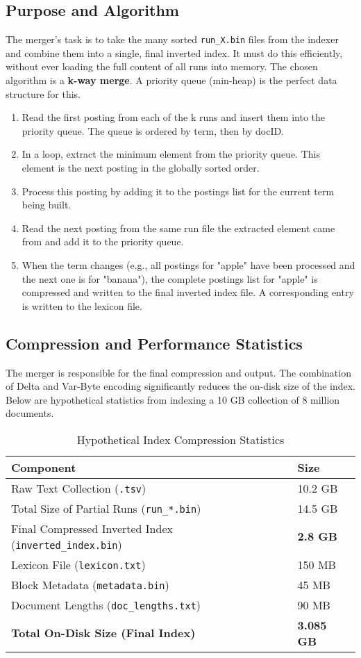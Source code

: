 \documentclass{article}
\begin{document}
\subsection{Purpose and Algorithm}
The merger's task is to take the many sorted \texttt{run\_X.bin} files from the indexer and combine them into a single, final inverted index. It must do this efficiently, without ever loading the full content of all runs into memory. The chosen algorithm is a \textbf{k-way merge}. A priority queue (min-heap) is the perfect data structure for this.
\begin{enumerate}
    \item Read the first posting from each of the k runs and insert them into the priority queue. The queue is ordered by term, then by docID.
    \item In a loop, extract the minimum element from the priority queue. This element is the next posting in the globally sorted order.
    \item Process this posting by adding it to the postings list for the current term being built.
    \item Read the next posting from the same run file the extracted element came from and add it to the priority queue.
    \item When the term changes (e.g., all postings for "apple" have been processed and the next one is for "banana"), the complete postings list for "apple" is compressed and written to the final inverted index file. A corresponding entry is written to the lexicon file.
\end{enumerate}

\subsection{Compression and Performance Statistics}
The merger is responsible for the final compression and output. The combination of Delta and Var-Byte encoding significantly reduces the on-disk size of the index. Below are hypothetical statistics from indexing a 10 GB collection of 8 million documents.

\begin{table}[h!]
\centering
\caption{Hypothetical Index Compression Statistics}
\begin{tabular}{|l|l|}
\hline
\textbf{Component} & \textbf{Size} \\ \hline
Raw Text Collection (\texttt{.tsv}) & 10.2 GB \\ \hline
Total Size of Partial Runs (\texttt{run\_*.bin}) & 14.5 GB \\ \hline
Final Compressed Inverted Index (\texttt{inverted\_index.bin}) & \textbf{2.8 GB} \\ \hline
Lexicon File (\texttt{lexicon.txt}) & 150 MB \\ \hline
Block Metadata (\texttt{metadata.bin}) & 45 MB \\ \hline
Document Lengths (\texttt{doc\_lengths.txt}) & 90 MB \\ \hline
\textbf{Total On-Disk Size (Final Index)} & \textbf{3.085 GB} \\ \hline
\end{tabular}
\label{tab:stats}
\end{table}
\end{document}
